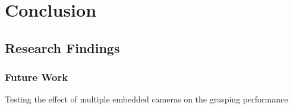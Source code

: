 \chapter{Conclusion}


\section{Research Findings}


\subsection{Future Work}
Testing the effect of multiple embedded cameras on the grasping performance




